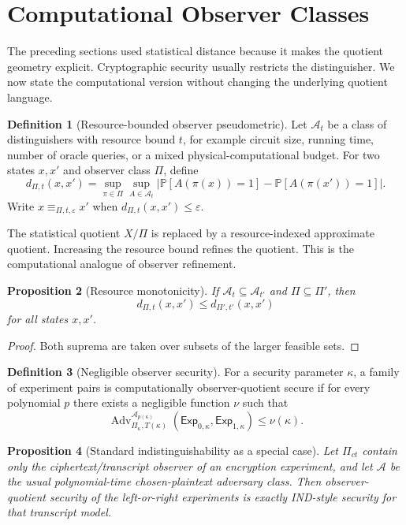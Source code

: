 \documentclass[11pt]{article}
\theoremstyle{definition}
\newtheorem{definition}{Definition}[section]
\theoremstyle{plain}
\newtheorem{proposition}[definition]{Proposition}
\theoremstyle{remark}
\newcommand{\Prb}{\mathbb{P}}
\newcommand{\cA}{\mathcal{A}}
\newcommand{\eps}{\varepsilon}
\begin{document}
\section{Computational Observer Classes}

The preceding sections used statistical distance because it makes the quotient geometry explicit. Cryptographic security usually restricts the distinguisher. We now state the computational version without changing the underlying quotient language.

\begin{definition}[Resource-bounded observer pseudometric]
Let $\cA_t$ be a class of distinguishers with resource bound $t$, for example circuit size, running time, number of oracle queries, or a mixed physical-computational budget. For two states $x,x'$ and observer class $\Pi$, define
\[
    d_{\Pi,t}(x,x')=\sup_{\pi\in\Pi}\sup_{A\in\cA_t}
    \left|\Prb[A(\pi(x))=1]-\Prb[A(\pi(x'))=1]\right|.
\]
Write $x\equiv_{\Pi,t,\eps}x'$ when $d_{\Pi,t}(x,x')\le\eps$.
\end{definition}

The statistical quotient $X/\Pi$ is replaced by a resource-indexed approximate quotient. Increasing the resource bound refines the quotient. This is the computational analogue of observer refinement.

\begin{proposition}[Resource monotonicity]
If $\cA_t\subseteq\cA_{t'}$ and $\Pi\subseteq\Pi'$, then
\[
    d_{\Pi,t}(x,x')\le d_{\Pi',t'}(x,x')
\]
for all states $x,x'$.
\end{proposition}

\begin{proof}
Both suprema are taken over subsets of the larger feasible sets.
\end{proof}

\begin{definition}[Negligible observer security]
For a security parameter $\kappa$, a family of experiment pairs is computationally observer-quotient secure if for every polynomial $p$ there exists a negligible function $\nu$ such that
\[
    \operatorname{Adv}_{\Pi_\kappa,T(\kappa)}^{\cA_{p(\kappa)}}(\mathsf{Exp}_{0,\kappa},\mathsf{Exp}_{1,\kappa})
    \le \nu(\kappa).
\]
\end{definition}

\begin{proposition}[Standard indistinguishability as a special case]
Let $\Pi_{ct}$ contain only the ciphertext/transcript observer of an encryption experiment, and let $\cA$ be the usual polynomial-time chosen-plaintext adversary class. Then observer-quotient security of the left-or-right experiments is exactly IND-style security for that transcript model.
\end{proposition}
\end{document}
